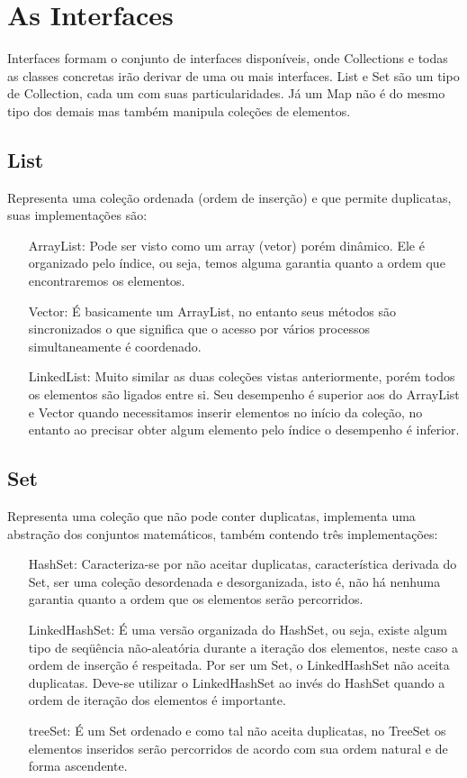 \section{As Interfaces} \label{sec:interfaces}
	Interfaces formam o conjunto de interfaces disponíveis, onde Collections e todas as classes concretas irão derivar de uma ou mais interfaces.
	List e Set são um tipo de Collection, cada um com suas particularidades. Já um Map não é do mesmo tipo dos demais mas também manipula coleções de elementos.
	\subsection{List}
		Representa uma coleção ordenada (ordem de inserção) e que permite duplicatas, suas implementações são:
		\begin{itemize}
			\item[ArrayList:] Pode ser visto como um array (vetor) porém dinâmico. Ele é organizado pelo índice, ou seja, temos alguma garantia quanto a ordem que encontraremos os elementos.
			\item[Vector:] É basicamente um ArrayList, no entanto seus métodos são sincronizados o que significa que o acesso por vários processos simultaneamente é coordenado.
			\item[LinkedList:] Muito similar as duas coleções vistas anteriormente, porém todos os elementos são ligados entre si. Seu desempenho é superior aos do ArrayList e Vector quando necessitamos inserir elementos no início da coleção, no entanto ao precisar obter algum elemento pelo índice o desempenho é inferior.
		\end{itemize}
	\subsection{Set}
		Representa uma coleção que não pode conter duplicatas, implementa uma abstração dos conjuntos matemáticos, também contendo três implementações:
		\begin{itemize}
			\item[HashSet:] Caracteriza-se por não aceitar duplicatas, característica derivada do Set, ser uma coleção desordenada e desorganizada, isto é, não há nenhuma garantia quanto a ordem que os elementos serão percorridos.
			\item[LinkedHashSet:] É uma versão organizada do HashSet, ou seja, existe algum tipo de seqüência não-aleatória durante a iteração dos elementos, neste caso a ordem de inserção é respeitada. Por ser um Set, o LinkedHashSet não aceita duplicatas. Deve-se utilizar o LinkedHashSet ao invés do HashSet quando a ordem de iteração dos elementos é importante.
			\item[treeSet:] É um Set ordenado e como tal não aceita duplicatas, no TreeSet os elementos inseridos serão percorridos de acordo com sua ordem natural e de forma ascendente.
		\end{itemize}
